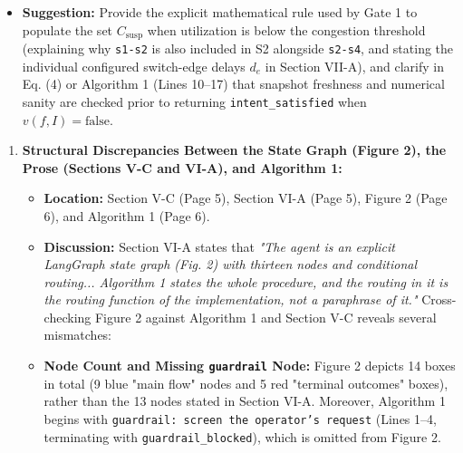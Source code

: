 \documentclass[11pt,a4paper]{article}
\begin{document}
\begin{enumerate}[leftmargin=1.6em,itemsep=3pt]
\begin{itemize}[leftmargin=1.8em,itemsep=2pt]
\item \textbf{Suggestion:} Provide the explicit mathematical rule used by Gate 1 to populate the set $C_{\text{susp}}$ when utilization is below the congestion threshold (explaining why \texttt{s1-s2} is also included in S2 alongside \texttt{s2-s4}, and stating the individual configured switch-edge delays $d_e$ in Section VII-A), and clarify in Eq. (4) or Algorithm 1 (Lines 10–17) that snapshot freshness and numerical sanity are checked prior to returning \texttt{intent\_satisfied} when $v(f, I) = \text{false}$.
\end{itemize}
\end{enumerate}
\begin{enumerate}[leftmargin=1.6em,itemsep=3pt]
\item \textbf{Structural Discrepancies Between the State Graph (Figure 2), the Prose (Sections V-C and VI-A), and Algorithm 1:}
\begin{itemize}[leftmargin=1.8em,itemsep=2pt]
\item \textbf{Location:} Section V-C (Page 5), Section VI-A (Page 5), Figure 2 (Page 6), and Algorithm 1 (Page 6).
\item \textbf{Discussion:} Section VI-A states that \emph{"The agent is an explicit LangGraph state graph (Fig. 2) with thirteen nodes and conditional routing... Algorithm 1 states the whole procedure, and the routing in it is the routing function of the implementation, not a paraphrase of it."} Cross-checking Figure 2 against Algorithm 1 and Section V-C reveals several mismatches:
\item \textbf{Node Count and Missing \texttt{guardrail} Node:} Figure 2 depicts 14 boxes in total (9 blue "main flow" nodes and 5 red "terminal outcomes" boxes), rather than the 13 nodes stated in Section VI-A. Moreover, Algorithm 1 begins with \texttt{guardrail: screen the operator's request} (Lines 1–4, terminating with \texttt{guardrail\_blocked}), which is omitted from Figure 2.

\end{itemize}
\end{enumerate}
\end{document}
